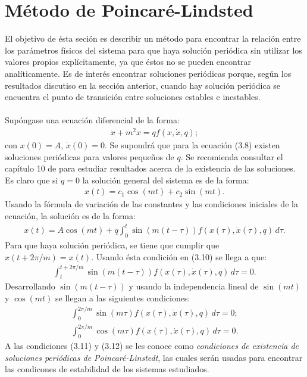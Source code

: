\section{Método de Poincaré-Lindsted}
El objetivo de ésta seción es describir un método para encontrar la relación entre los parámetros físicos del sistema para que haya solución periódica sin utilizar los valores propios explícitamente, ya que éstos no se pueden encontrar analíticamente. Es de interés encontrar soluciones periódicas porque, según los resultados discutiso en la sección anterior, cuando hay solución periódica se encuentra el punto de transición entre soluciones estables e inestables.
\\
\\
Supóngase una ecuación diferencial de la forma:
\begin{eqnarray}
\ddot{x}+m^{2}x=qf(x,\dot{x},q);
\end{eqnarray}
con $x(0)=A$, $\dot{x}(0)=0$. Se supondrá que para la ecuación (3.8) existen soluciones periódicas para valores pequeños de $q$. Se recomienda consultar el capítulo 10 de \citep{ver} para estudiar resultados acerca de la existencia de las soluciones. Es claro que si $q=0$ la solución general del sistema es de la forma:
\begin{eqnarray}
x(t)=c_{1}\cos(mt)+c_{2}\sin(mt).
\end{eqnarray}
Usando la fórmula de variación de las constantes y las condiciones iniciales de la ecuación, la solución es de la forma:
\begin{eqnarray}
x(t)=A\cos(mt)+q\displaystyle\int_{0}^{t} \sin(m(t-\tau))f(x(\tau),\dot{x}(\tau),q) \, d\tau .
\end{eqnarray}
Para que haya solución periódica, se tiene que cumplir que $x(t+2\pi/m)=x(t)$. Usando ésta condición en (3.10) se llega a que:
\begin{eqnarray*}
\displaystyle\int_{t}^{t+2\pi / m} \sin(m(t-\tau))f(x(\tau),\dot{x}(\tau),q) \, d\tau =0.
\end{eqnarray*}
Desarrollando $\sin(m(t-\tau))$ y usando la independencia lineal de $\sin(mt)$ y $\cos(mt)$ se llegan a las siguientes condiciones:
\begin{eqnarray}
\displaystyle\int_{0}^{2\pi / m} \sin(m\tau)f(x(\tau),\dot{x}(\tau),q) \, d\tau =0;
\end{eqnarray}
\begin{eqnarray}
\displaystyle\int_{0}^{2\pi / m} \cos(m\tau)f(x(\tau),\dot{x}(\tau),q) \, d\tau =0.
\end{eqnarray}
A las condiciones (3.11) y (3.12) se les conoce como \emph{condiciones de existencia de soluciones periódicas de Poincaré-Linstedt}, las cuales serán usadas para encontrar las condicones de estabilidad de los sistemas estudiados.
